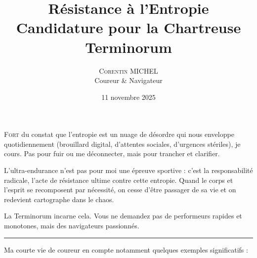 \documentclass[10pt, a4paper, twocolumn]{article}
\title{\vspace{-1.5cm}\textbf{\LARGE Résistance à l'Entropie}\\ \large Candidature pour la Chartreuse Terminorum}
\author{\textsc{Corentin MICHEL}\\ \small Coureur \& Navigateur}
\date{\vspace{-0.5em}11 novembre 2025}
\begin{document}
\maketitle
\thispagestyle{empty} %

\noindent
\lettrine[lines=3, lraise=0.1, nindent=0em, slope=-0.5em]{F}{ort} du constat que l'entropie est un nuage de désordre qui nous enveloppe quotidiennement (brouillard digital, d'attentes sociales, d'urgences stériles), je cours. Pas pour fuir ou me déconnecter, mais pour trancher et clarifier. 

L'ultra-endurance n'est pas pour moi une épreuve sportive : c'est la responsabilité radicale, l'acte de résistance ultime contre cette entropie. Quand le corps et l'esprit se recomposent par nécessité, on cesse d'être passager de sa vie et on redevient cartographe dans le chaos.

La Terminorum incarne cela. Vous ne demandez pas de performeurs rapides et monotones, mais des navigateurs passionnés.

\vspace{0.5cm}
\noindent\rule{0.4\linewidth}{0.5pt} %
\vspace{0.5cm}

Ma courte vie de coureur en compte notamment quelques exemples significatifs :
\end{document}
